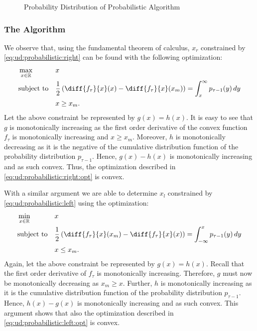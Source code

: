 \begin{figure}
    \centering
    [TODO]

    \caption{Probability Distribution of Probabilistic Algorithm}
    \label{fig:probability_distribution_of_probabilistic_algorithm}
\end{figure}

\subsubsection{The Algorithm}

We observe that, using the fundamental theorem of calculus, $x_r$ constrained by \autoref{eq:ud:probabilistic:right} can be found with the following optimization: \begin{align}\label{eq:ud:probabilistic:right:opt}\begin{aligned}
    &\max_{x \in \mathbb{R}} &&x \\
    &\text{subject to}        &&\frac{1}{2} \left(\diff{f_{\tau}}{x}(x) - \diff{f_{\tau}}{x}(x_m)\right) = \int_{x}^{\infty} p_{\tau-1}(y) \,dy \\
    &                         &&x \geq x_m.
\end{aligned}\end{align} Let the above constraint be represented by $g(x) = h(x)$. It is easy to see that $g$ is monotonically increasing as the first order derivative of the convex function $f_{\tau}$ is monotonically increasing and $x \geq x_m$. Moreover, $h$ is monotonically decreasing as it is the negative of the cumulative distribution function of the probability distribution $p_{\tau-1}$. Hence, $g(x) - h(x)$ is monotonically increasing and as such convex. Thus, the optimization described in \autoref{eq:ud:probabilistic:right:opt} is convex.

With a similar argument we are able to determine $x_l$ constrained by \autoref{eq:ud:probabilistic:left} using the optimization: \begin{align}\label{eq:ud:probabilistic:left:opt}\begin{aligned}
    &\min_{x \in \mathbb{R}} &&x \\
    &\text{subject to}        &&\frac{1}{2} \left(\diff{f_{\tau}}{x}(x_m) - \diff{f_{\tau}}{x}(x)\right) = \int_{-\infty}^{x} p_{\tau-1}(y) \,dy \\
    &                         &&x \leq x_m.
\end{aligned}\end{align} Again, let the above constraint be represented by $g(x) = h(x)$. Recall that the first order derivative of $f_{\tau}$ is monotonically increasing. Therefore, $g$ must now be monotonically decreasing as $x_m \geq x$. Further, $h$ is monotonically increasing as it is the cumulative distribution function of the probability distribution $p_{\tau-1}$. Hence, $h(x) - g(x)$ is monotonically increasing and as such convex. This argument shows that also the optimization described in \autoref{eq:ud:probabilistic:left:opt} is convex.

